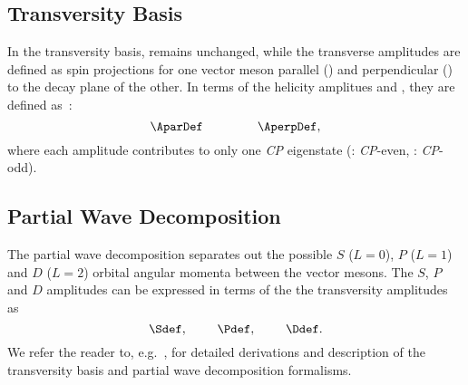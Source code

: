 \subsection{Transversity Basis\label{Transversity Basis}}
In the transversity basis, \Az remains unchanged, while the transverse amplitudes are defined as spin projections for one vector meson parallel (\Apar) and perpendicular (\Aperp) to the decay plane of the other. In terms of the helicity amplitues \Ap and \Am, they are defined as~\cite{transverse_amplitudes}:
\begin{equation}
\AparDef~~~~~~~~~~~~~\AperpDef,
\end{equation}
where each amplitude contributes to only one \textit{CP} eigenstate (\Apar: \textit{CP}-even, \Aperp: \textit{CP}-odd). %

\subsection{Partial Wave Decomposition\label{Partial Wave Decomposition}}
The partial wave decomposition separates out the possible $S$ ($L=0$), $P$ ($L=1$) and $D$ ($L=2$) orbital angular momenta between the vector mesons. The $S$, $P$ and $D$ amplitudes can be expressed in terms of the the transversity amplitudes as~\cite{partial_wave_amplitudes}
\begin{equation}
\Sdef,~~~~~~~\Pdef,~~~~~~~\Ddef.
\end{equation}
We refer the reader to, e.g.~\cite{hel_MC_dist, BBk, transverse_amplitudes, partial_wave_amplitudes}, for detailed derivations and description of the transversity basis and partial wave decomposition formalisms. 



